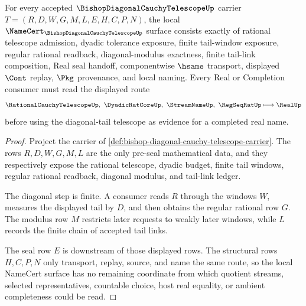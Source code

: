 \begin{theorem}
\label{thm:bishop-diagonal-cauchy-telescope-namecert-obligations}
For every accepted $\BishopDiagonalCauchyTelescopeUp$ carrier $T=(R,D,W,G,M,L,E,H,C,P,N)$, the local $\NameCert_{\BishopDiagonalCauchyTelescopeUp}$ surface consists exactly of rational telescope admission, dyadic tolerance exposure, finite tail-window exposure, regular rational readback, diagonal-modulus exactness, finite tail-link composition, Real seal handoff, componentwise $\hsame$ transport, displayed $\Cont$ replay, $\Pkg$ provenance, and local naming. Every Real or Completion consumer must read the displayed route
$$
\RationalCauchyTelescopeUp,\ \DyadicRatCoreUp,\ \StreamNameUp,\ \RegSeqRatUp
\longmapsto \RealUp
$$
before using the diagonal-tail telescope as evidence for a completed real name.
\end{theorem}
\begin{proof}
Project the carrier of \autoref{def:bishop-diagonal-cauchy-telescope-carrier}. The rows $R,D,W,G,M,L$ are the only pre-seal mathematical data, and they respectively expose the rational telescope, dyadic budget, finite tail windows, regular rational readback, diagonal modulus, and tail-link ledger.

The diagonal step is finite. A consumer reads $R$ through the windows $W$, measures the displayed tail by $D$, and then obtains the regular rational row $G$. The modulus row $M$ restricts later requests to weakly later windows, while $L$ records the finite chain of accepted tail links.

The seal row $E$ is downstream of those displayed rows. The structural rows $H,C,P,N$ only transport, replay, source, and name the same route, so the local NameCert surface has no remaining coordinate from which quotient streams, selected representatives, countable choice, host real equality, or ambient completeness could be read.
\end{proof}

